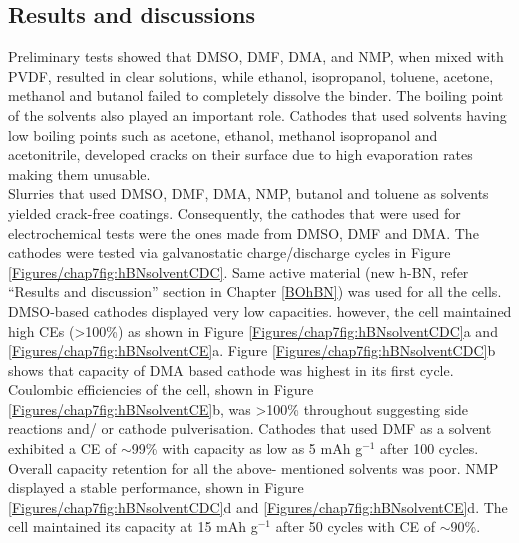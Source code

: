 \subsection{Results and discussions}
Preliminary tests showed that DMSO, DMF, DMA, and NMP, when mixed with PVDF, resulted in clear solutions, while ethanol, isopropanol, toluene, acetone, methanol and butanol failed to completely dissolve the binder. The boiling point of the solvents also played an important role. Cathodes that used solvents having low boiling points such as acetone, ethanol, methanol isopropanol and acetonitrile, developed cracks on their surface due to high evaporation rates making them unusable. \\
Slurries that used DMSO, DMF, DMA, NMP, butanol and toluene as solvents yielded crack-free coatings. Consequently, the cathodes that were used for electrochemical tests were the ones made from DMSO, DMF and DMA. The cathodes were tested via galvanostatic charge/discharge cycles in Figure \ref{Figures/chap7fig:hBNsolventCDC}. Same active material (new h-BN, refer \enquote{Results and discussion} section in Chapter \ref{BOhBN}) was used for all the cells. DMSO-based cathodes displayed very low capacities. however, the cell maintained high CEs (>100\%) as shown in Figure \ref{Figures/chap7fig:hBNsolventCDC}a and \ref{Figures/chap7fig:hBNsolventCE}a.  Figure \ref{Figures/chap7fig:hBNsolventCDC}b  shows that capacity of DMA based cathode was highest in its first cycle. Coulombic efficiencies of the cell, shown in Figure \ref{Figures/chap7fig:hBNsolventCE}b, was >100\% throughout suggesting side reactions and/ or cathode pulverisation. Cathodes that used DMF as a solvent exhibited a CE of $\sim$99\% with capacity as low as 5 mAh g$^{-1}$ after 100 cycles. Overall capacity retention for all the above- mentioned solvents was poor. NMP displayed a stable performance, shown in Figure \ref{Figures/chap7fig:hBNsolventCDC}d and \ref{Figures/chap7fig:hBNsolventCE}d. The cell maintained its capacity at 15 mAh g$^{-1}$ after 50 cycles with CE of $\sim$90\%. 

